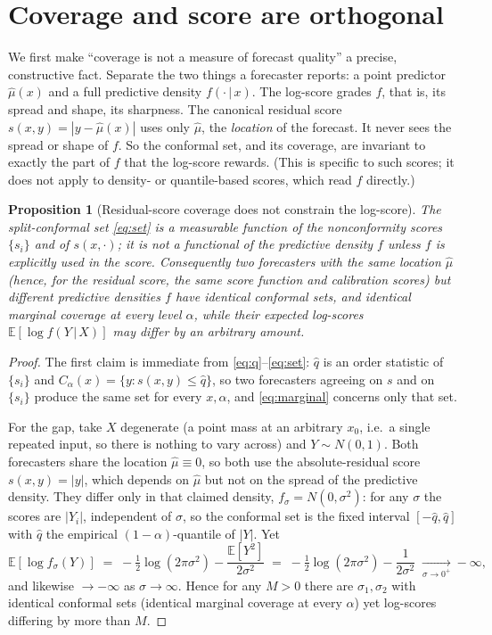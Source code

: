 \documentclass[10pt]{article} %
\newtheorem{proposition}{Proposition}
\theoremstyle{definition}
\newcommand{\E}{\mathbb{E}}
\newcommand{\given}{\,\vert\,}
\begin{document}
\section{Coverage and score are orthogonal}\label{sec:orthogonality}

We first make ``coverage is not a measure of forecast quality'' a precise, constructive
fact. Separate the two things a forecaster reports: a point predictor $\hat\mu(x)$ and a
full predictive density $f(\cdot\given x)$. The log-score grades $f$, that is, its spread
and shape, its sharpness. The canonical residual score $s(x,y)=|y-\hat\mu(x)|$ uses only
$\hat\mu$, the \emph{location} of the forecast. It never sees the spread or shape of $f$.
So the conformal set, and its coverage, are invariant to exactly the part of $f$ that the
log-score rewards. (This is specific to such scores; it does not apply to density- or
quantile-based scores, which read $f$ directly.)

\begin{proposition}[Residual-score coverage does not constrain the log-score]\label{prop:orth}
The split-conformal set \eqref{eq:set} is a measurable function of the nonconformity
scores $\{s_i\}$ and of $s(x,\cdot)$; it is not a functional of the predictive density
$f$ unless $f$ is explicitly used in the score. Consequently two forecasters with the
\emph{same} location $\hat\mu$ (hence, for the residual score, the same score function and
calibration scores) but different predictive densities $f$ have \emph{identical} conformal
sets, and identical marginal coverage at every level $\alpha$, while their expected
log-scores $\E[\log f(Y\given X)]$ may differ by an arbitrary amount.
\end{proposition}

\begin{proof}
The first claim is immediate from \eqref{eq:q}--\eqref{eq:set}: $\hat q$ is an order
statistic of $\{s_i\}$ and $C_\alpha(x)=\{y:s(x,y)\le\hat q\}$, so two forecasters
agreeing on $s$ and on $\{s_i\}$ produce the same set for every $x,\alpha$, and
\eqref{eq:marginal} concerns only that set.

For the gap, take $X$ degenerate (a point mass at an arbitrary $x_0$, i.e.\ a single
repeated input, so there is nothing to vary across) and $Y\sim N(0,1)$. Both forecasters
share the location
$\hat\mu\equiv 0$, so both use the absolute-residual score $s(x,y)=|y|$, which depends on
$\hat\mu$ but not on the spread of the predictive density. They differ only in that claimed
density, $f_\sigma=N(0,\sigma^2)$: for any $\sigma$ the scores are $|Y_i|$, independent of
$\sigma$, so the conformal set is the fixed interval $[-\hat q,\hat q]$ with $\hat q$ the
empirical $(1-\alpha)$-quantile of $|Y|$. Yet
\[
  \E[\log f_\sigma(Y)] \;=\; -\tfrac12\log(2\pi\sigma^2)-\frac{\E[Y^2]}{2\sigma^2}
  \;=\; -\tfrac12\log(2\pi\sigma^2)-\frac{1}{2\sigma^2}\;\xrightarrow[\sigma\to 0^+]{}-\infty,
\]
and likewise $\to-\infty$ as $\sigma\to\infty$. Hence for any $M>0$ there are
$\sigma_1,\sigma_2$ with identical conformal sets (identical marginal coverage at every
$\alpha$) yet log-scores differing by more than $M$.
\end{proof}
\end{document}
